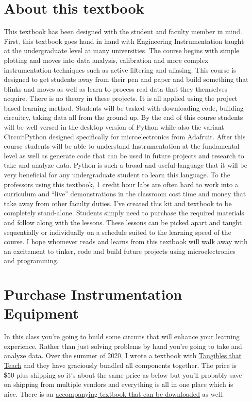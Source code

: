 \documentclass{article}
\begin{document}
\section*{About this textbook}

This textbook has been designed with the student and faculty member in
mind. First, this textbook goes hand in hand with Engineering
Instrumentation taught at the undergraduate level at many
universities. The course begins with simple plotting and moves into
data analysis, calibration and more complex instrumentation techniques
such as active filtering and aliasing. This course is designed to get
students away from their pen and paper and build something that blinks
and moves as well as learn to process real data that they themselves
acquire. There is no theory in these projects. It is all applied using
the project based learning method. Students will be tasked with
downloading code, building circuitry, taking data all from the ground
up. By the end of this course students will be well versed in the
desktop version of Python while also the variant CircuitPython
designed specifically for microelectronics from Adafruit. After this
course students will be able to understand Instrumentation at the
fundamental level as well as generate code that can be used in future
projects and research to take and analyze data. Python is such a broad
and useful language that it will be very beneficial for any
undergraduate student to learn this language. To the professors using
this textbook, 1 credit hour labs are often hard to work into a
curriculum and “live” demonstrations in the classroom cost time and
money that take away from other faculty duties. I’ve created this kit
and textbook to be completely stand-alone. Students simply need to
purchase the required materials and follow along with the
lessons. These lessons can be picked apart and taught sequentially or
individually on a schedule suited to the learning speed of the
course. I hope whomever reads and learns from this textbook will walk
away with an excitement to tinker, code and build future projects
using microelectronics and programming.

\newpage

\tableofcontents

\newpage

\section{Purchase Instrumentation Equipment}

In this class you’re going to build some circuits that will enhance
your learning experience. Rather than just solving problems by hand
you’re going to take and analyze data. Over the summer of 2020, I
wrote a textbook with
\href{https://www.tangiblesthatteach.com/shop}{Tangibles that Teach}
and they have graciously 
bundled all components together. The price is \$50 plus shipping so
it’s about the same price as below but you’ll probably save on
shipping from multiple vendors and everything is all in one place
which is nice. There is an
\href{https://www.tangiblesthatteach.com/downloads}{accompanying textbook that can be downloaded} as well. 
\end{document}
